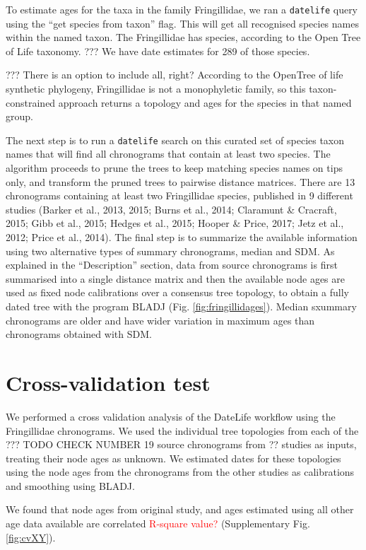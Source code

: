 \documentclass[
  english,
  man]{apa6}
\begin{document}
To estimate ages for the taxa in the family Fringillidae, we ran a \texttt{datelife} query using the ``get species from taxon'' flag.
This will get all recognised species names within the named taxon.
The Fringillidae has species, according to the Open Tree of Life taxonomy.
??? We have date estimates for 289 of those species.

??? There is an option to include all, right?
According to the OpenTree of life synthetic phylogeny, Fringillidae is not a monophyletic family, so this taxon-constrained approach returns a topology and ages for the species in that named group.

The next step is to run a \texttt{datelife} search on this curated set of species taxon names that will find all chronograms that contain at least two species. The algorithm proceeds to prune the trees to keep matching species names on tips only, and transform the pruned trees to pairwise distance matrices.
There are 13 chronograms containing at least two Fringillidae species, published in 9 different studies (Barker et al., 2013, 2015; Burns et al., 2014; Claramunt \& Cracraft, 2015; Gibb et al., 2015; Hedges et al., 2015; Hooper \& Price, 2017; Jetz et al., 2012; Price et al., 2014).
The final step is to summarize the available information using two alternative types of summary chronograms, median and SDM. As explained in the ``Description'' section, data from source chronograms is first summarised into a single distance matrix and then the available node ages are used as fixed node calibrations over a consensus tree topology, to obtain a fully dated tree with the program BLADJ (Fig. \ref{fig:fringillidages}). Median sxummary chronograms are older and have wider variation in maximum ages than chronograms obtained with SDM.

\hypertarget{cross-validation-test}{%
\section{Cross-validation test}\label{cross-validation-test}}

We performed a cross validation analysis of the DateLife workflow using the Fringillidae chronograms.
We used the individual tree topologies from each of the ??? TODO CHECK NUMBER 19 source chronograms from ?? studies as inputs, treating their node ages as unknown.
We estimated dates for these topologies using the node ages from the chronograms from the other studies as calibrations and smoothing using BLADJ.

We found that node ages from original study, and ages estimated using all other age data available are correlated \textcolor{red}{R-square value?} (Supplementary Fig. \ref{fig:cvXY}).
\end{document}
